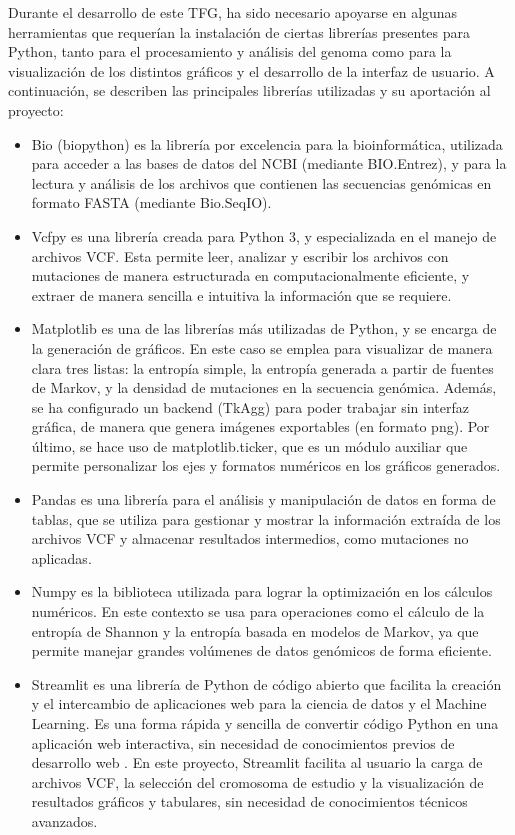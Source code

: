 \documentclass[11pt,spanish,listoffigures,listoftables]{tfgetsinf}
\begin{document}
Durante el desarrollo de este \ac{TFG}, ha sido necesario apoyarse en algunas herramientas que requerían la instalación de ciertas librerías presentes para Python, tanto para el procesamiento y análisis del genoma como para la visualización de los distintos gráficos y el desarrollo de la interfaz de usuario. A continuación, se describen las principales librerías utilizadas y su aportación al proyecto:

\begin{itemize}
   \item Bio (biopython) es la librería por excelencia para la bioinformática, utilizada para acceder a las bases de datos del \ac{NCBI} (mediante BIO.Entrez), y para la lectura y análisis de los archivos que contienen las secuencias genómicas en formato \ac{FASTA} (mediante Bio.SeqIO).
   \item Vcfpy es una librería creada para Python 3, y especializada en el manejo de archivos \ac{VCF}. Esta permite leer, analizar y escribir los archivos con mutaciones de manera estructurada en computacionalmente eficiente, y extraer de manera sencilla e intuitiva la información que se requiere.
   \item Matplotlib es una de las librerías más utilizadas de Python, y se encarga de la generación de gráficos. En este caso se emplea para visualizar de manera clara tres listas: la entropía simple, la entropía generada a partir de fuentes de Markov, y la densidad de mutaciones en la secuencia genómica. Además, se ha configurado un backend (TkAgg) para poder trabajar sin interfaz gráfica, de manera que genera imágenes exportables (en formato png). Por último, se hace uso de matplotlib.ticker, que es un módulo auxiliar que permite personalizar los ejes y formatos numéricos en los gráficos generados.
   \item Pandas es una librería para el análisis y manipulación de datos en forma de tablas, que se utiliza para gestionar y mostrar la información extraída de los archivos \ac{VCF} y almacenar resultados intermedios, como mutaciones no aplicadas.
   \item Numpy es la biblioteca utilizada para lograr la optimización en los cálculos numéricos. En este contexto se usa para operaciones como el cálculo de la entropía de Shannon y la entropía basada en modelos de Markov, ya que permite manejar grandes volúmenes de datos genómicos de forma eficiente.
   \item Streamlit es una librería de Python de código abierto que facilita la creación y el intercambio de aplicaciones web para la ciencia de datos y el Machine Learning. Es una forma rápida y sencilla de convertir código Python en una aplicación web interactiva, sin necesidad de conocimientos previos de desarrollo web . En este proyecto, Streamlit facilita al usuario la carga de archivos \ac{VCF}, la selección del cromosoma de estudio y la visualización de resultados gráficos y tabulares, sin necesidad de conocimientos técnicos avanzados.
\end{itemize}
\end{document}
